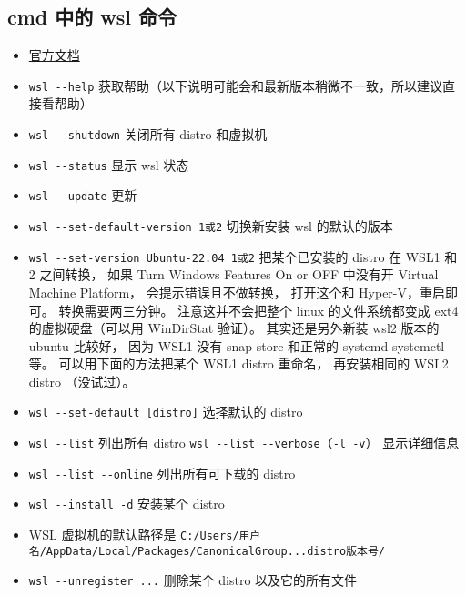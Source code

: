 \subsection{cmd 中的 wsl 命令}
\begin{itemize}
\item \href{https://docs.microsoft.com/en-us/windows/wsl/}{官方文档}
\item \verb`wsl --help` 获取帮助（以下说明可能会和最新版本稍微不一致，所以建议直接看帮助）
\item \verb`wsl --shutdown` 关闭所有 distro 和虚拟机
\item \verb`wsl --status` 显示 wsl 状态
\item \verb`wsl --update` 更新
\item \verb`wsl --set-default-version 1或2` 切换新安装 wsl 的默认的版本
\item \verb`wsl --set-version Ubuntu-22.04 1或2` 把某个已安装的 distro 在 WSL1 和 2 之间转换， 如果 Turn Windows Features On or OFF 中没有开 Virtual Machine Platform， 会提示错误且不做转换， 打开这个和 Hyper-V，重启即可。 转换需要两三分钟。 注意这并不会把整个 linux 的文件系统都变成 ext4 的虚拟硬盘（可以用 WinDirStat 验证）。 其实还是另外新装 wsl2 版本的 ubuntu 比较好， 因为 WSL1 没有 snap store 和正常的 systemd systemctl 等。 可以用下面的方法把某个 WSL1 distro 重命名， 再安装相同的 WSL2 distro （没试过）。
\item \verb`wsl --set-default [distro]` 选择默认的 distro
\item \verb`wsl --list` 列出所有 distro \verb`wsl --list --verbose`（\verb|-l -v|） 显示详细信息
\item \verb`wsl --list --online` 列出所有可下载的 distro
\item \verb`wsl --install -d` 安装某个 distro
\item WSL 虚拟机的默认路径是 \verb`C:/Users/用户名/AppData/Local/Packages/CanonicalGroup...distro版本号/`
\item \verb`wsl --unregister ...` 删除某个 distro 以及它的所有文件


\end{itemize}
